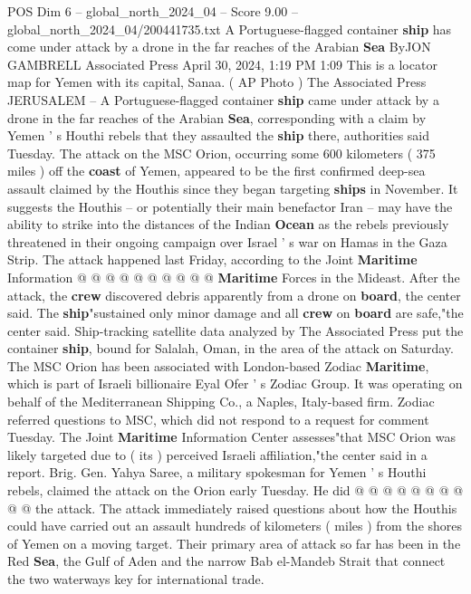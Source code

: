 \begin{textsample}{POS Dim 6 – global\_north\_2024\_04 – Score 9.00 – global\_north\_2024\_04/200441735.txt}  \label{ex:f6_pos_112}
A Portuguese-flagged container \textbf{ship} has come under attack by a drone in the far reaches of the Arabian \textbf{Sea} ByJON GAMBRELL Associated Press April 30, 2024, 1:19 PM 1:09 This is a locator map for Yemen with its capital, Sanaa. ( AP Photo ) The Associated Press JERUSALEM -- A Portuguese-flagged container \textbf{ship} came under attack by a drone in the far reaches of the Arabian \textbf{Sea}, corresponding with a claim by Yemen ' s Houthi rebels that they assaulted the \textbf{ship} there, authorities said Tuesday.
The attack on the MSC Orion, occurring some 600 kilometers ( 375 miles ) off the \textbf{coast} of Yemen, appeared to be the first confirmed deep-sea assault claimed by the Houthis since they began targeting \textbf{ships} in November.
It suggests the Houthis -- or potentially their main benefactor Iran -- may have the ability to strike into the distances of the Indian \textbf{Ocean} as the rebels previously threatened in their ongoing campaign over Israel ' s war on Hamas in the Gaza Strip.
The attack happened last Friday, according to the Joint \textbf{Maritime} Information @ @ @ @ @ @ @ @ @ @ \textbf{Maritime} Forces in the Mideast.
After the attack, the \textbf{crew} discovered debris apparently from a drone on \textbf{board}, the center said.
The \textbf{ship}"sustained only minor damage and all \textbf{crew} on \textbf{board} are safe,"the center said.
Ship-tracking satellite data analyzed by The Associated Press put the container \textbf{ship}, bound for Salalah, Oman, in the area of the attack on Saturday.
The MSC Orion has been associated with London-based Zodiac \textbf{Maritime}, which is part of Israeli billionaire Eyal Ofer ' s Zodiac Group.
It was operating on behalf of the Mediterranean Shipping Co., a Naples, Italy-based firm.
Zodiac referred questions to MSC, which did not respond to a request for comment Tuesday.
The Joint \textbf{Maritime} Information Center assesses"that MSC Orion was likely targeted due to ( its ) perceived Israeli affiliation,"the center said in a report.
Brig.
Gen.
Yahya Saree, a military spokesman for Yemen ' s Houthi rebels, claimed the attack on the Orion early Tuesday.
He did @ @ @ @ @ @ @ @ @ @ the attack.
The attack immediately raised questions about how the Houthis could have carried out an assault hundreds of kilometers ( miles ) from the shores of Yemen on a moving target.
Their primary area of attack so far has been in the Red \textbf{Sea}, the Gulf of Aden and the narrow Bab el-Mandeb Strait that connect the two waterways key for international trade.

\end{textsample}
